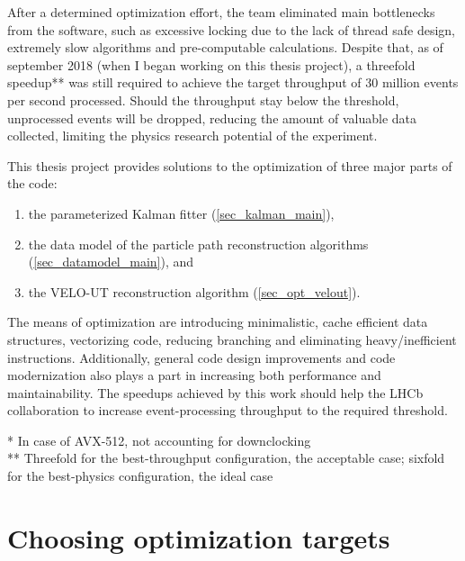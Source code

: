 \documentclass[12pt]{article}
\newcommand\tab[1][.7cm]{\hspace*{#1}}
\begin{document}
\vspace{1pc}
After a determined optimization effort, the team eliminated main bottlenecks from the software, such as excessive locking due to the lack of thread safe design, extremely slow algorithms and pre-computable calculations. Despite that, as of september 2018 (when I began working on this thesis project), a threefold speedup** was still required to achieve the target throughput of 30 million events per second processed. Should the throughput stay below the threshold, unprocessed events will be dropped, reducing the amount of valuable data collected, limiting the physics research potential of the experiment.

\vspace{1pc}
This thesis project provides solutions to the optimization of three major parts of the code:
\begin{enumerate}
	\item the parameterized Kalman fitter (\ref{sec_kalman_main}),
	\item the data model of the particle path reconstruction algorithms (\ref{sec_datamodel_main}), and
	\item the VELO-UT reconstruction algorithm (\ref{sec_opt_velout}).
\end{enumerate}
The means of optimization are introducing minimalistic, cache efficient data structures, vectorizing code, reducing branching and eliminating heavy/inefficient instructions. Additionally, general code design improvements and code modernization also plays a part in increasing both performance and maintainability. The speedups achieved by this work should help the LHCb collaboration to increase event-processing throughput to the required threshold.

\vspace{1pc}
\small
\noindent\tab* In case of AVX-512, not accounting for downclocking\\
\noindent\tab** Threefold for the best-throughput configuration, the acceptable case; sixfold for the best-physics configuration, the ideal case
\normalsize


\newpage
\section{Choosing optimization targets}
\end{document}
